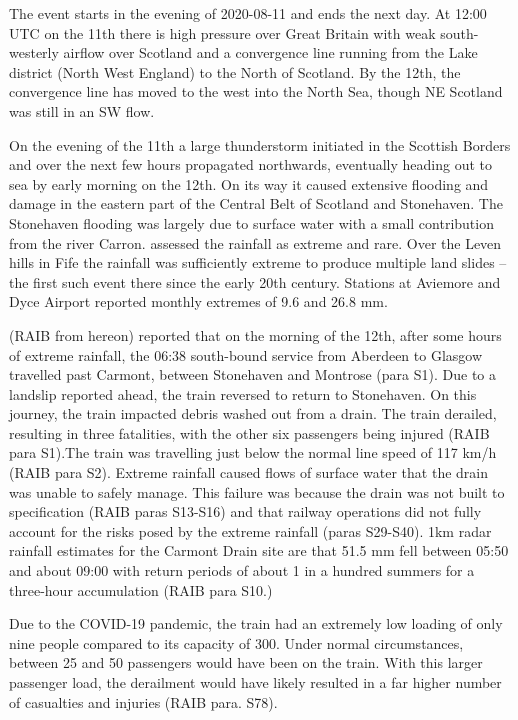 \documentclass[11pt,a4paper]{article}
\begin{document}
  The event starts in the evening of 2020-08-11 and ends the next day. At 12:00 UTC on the 11th there is high pressure over Great Britain with weak south-westerly airflow over Scotland and a convergence line running from the Lake district (North West England) to the North of Scotland\parencite{pritchard2020weather}. By the 12th, the convergence line has moved to the west into the North Sea, though NE Scotland was still in an SW flow. 

On  the evening of the 11th  a large thunderstorm initiated in the Scottish Borders and over the next few hours propagated northwards, eventually heading out to sea by early morning on the 12th\parencite{Kendon2020thunderstrorms_report}. On its way it caused extensive flooding and damage in the eastern part of the Central Belt of Scotland\parencite{SEPA2020report_floods,kendon2021ukclimate} and  Stonehaven. The Stonehaven flooding was largely due to surface water with a small contribution from the river Carron. \cite{SEPA2020report_floods} assessed the rainfall as  extreme and rare. Over the Leven hills in Fife the rainfall was sufficiently extreme to produce multiple land slides -- the first such event there since the early 20th century\parencite{Kirkbride2021}.  Stations at Aviemore and Dyce Airport\parencite{pritchard2020weather} reported monthly extremes of 9.6 and 26.8 mm.

\cite{carmontReport2024} (RAIB from hereon) reported that on the morning of the 12th, after some hours of extreme rainfall, the 06:38 south-bound service from Aberdeen to Glasgow travelled past Carmont, between Stonehaven and Montrose (para S1). Due to a landslip reported ahead, the train reversed to return to Stonehaven. On this journey, the train impacted debris washed out from a drain. The train derailed, resulting in three fatalities, with the other six passengers being injured (RAIB para S1).The train was travelling just below the normal line speed of 117 km/h (RAIB para S2). Extreme rainfall caused flows of surface water that the drain was unable to safely manage. This failure was because the drain was not built to specification (RAIB paras S13-S16) and that railway operations did not fully account for the risks posed by the extreme rainfall (paras S29-S40). 1km radar rainfall estimates for the Carmont Drain site are that 51.5 mm fell between 05:50 and about 09:00 with return periods of about 1 in a hundred summers for a three-hour accumulation (RAIB para S10.)

Due to the COVID-19 pandemic, the train had an extremely low loading of only nine people compared to its capacity of 300. Under normal circumstances, between 25 and 50 passengers would have been on the train. With this larger passenger load, the derailment would have likely resulted in a far higher number of casualties and injuries (RAIB para. S78). 
\end{document}
